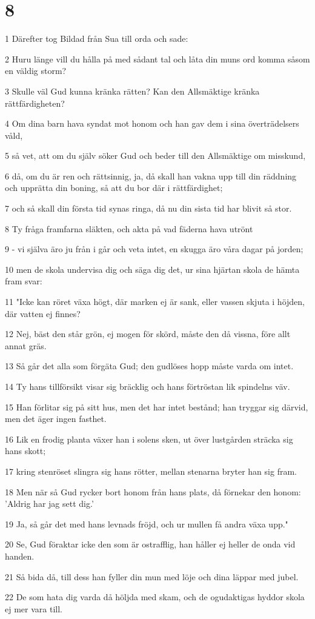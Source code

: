 \chapter{8}

\par 1 Därefter tog Bildad från Sua till orda och sade:
\par 2 Huru länge vill du hålla på med sådant tal och låta din muns ord komma såsom en väldig storm?
\par 3 Skulle väl Gud kunna kränka rätten? Kan den Allsmäktige kränka rättfärdigheten?
\par 4 Om dina barn hava syndat mot honom och han gav dem i sina överträdelsers våld,
\par 5 så vet, att om du själv söker Gud och beder till den Allsmäktige om misskund,
\par 6 då, om du är ren och rättsinnig, ja, då skall han vakna upp till din räddning och upprätta din boning, så att du bor där i rättfärdighet;
\par 7 och så skall din första tid synas ringa, då nu din sista tid har blivit så stor.
\par 8 Ty fråga framfarna släkten, och akta på vad fäderna hava utrönt
\par 9 - vi själva äro ju från i går och veta intet, en skugga äro våra dagar på jorden;
\par 10 men de skola undervisa dig och säga dig det, ur sina hjärtan skola de hämta fram svar:
\par 11 "Icke kan röret växa högt, där marken ej är sank, eller vassen skjuta i höjden, där vatten ej finnes?
\par 12 Nej, bäst den står grön, ej mogen för skörd, måste den då vissna, före allt annat gräs.
\par 13 Så går det alla som förgäta Gud; den gudlöses hopp måste varda om intet.
\par 14 Ty hans tillförsikt visar sig bräcklig och hans förtröstan lik spindelns väv.
\par 15 Han förlitar sig på sitt hus, men det har intet bestånd; han tryggar sig därvid, men det äger ingen fasthet.
\par 16 Lik en frodig planta växer han i solens sken, ut över lustgården sträcka sig hans skott;
\par 17 kring stenröset slingra sig hans rötter, mellan stenarna bryter han sig fram.
\par 18 Men när så Gud rycker bort honom från hans plats, då förnekar den honom: 'Aldrig har jag sett dig.'
\par 19 Ja, så går det med hans levnads fröjd, och ur mullen få andra växa upp."
\par 20 Se, Gud föraktar icke den som är ostrafflig, han håller ej heller de onda vid handen.
\par 21 Så bida då, till dess han fyller din mun med löje och dina läppar med jubel.
\par 22 De som hata dig varda då höljda med skam, och de ogudaktigas hyddor skola ej mer vara till.

